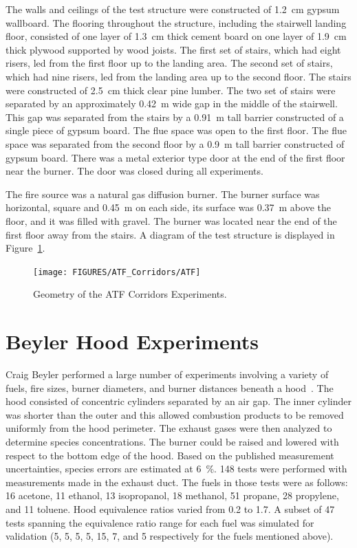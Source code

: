 The walls and ceilings of the test structure were constructed of 1.2~cm gypsum wallboard.
The flooring throughout the structure, including the stairwell landing floor, consisted of one layer of 1.3~cm thick cement board on one
layer of 1.9~cm thick plywood supported by wood joists. The first set of stairs, which had eight risers, led from the first floor up to the landing area.
The second set of stairs, which had nine risers, led from the landing area up to the second floor.
The stairs were constructed of 2.5~cm thick clear pine lumber. The two set of stairs were separated by an approximately 0.42~m wide gap in the middle of the stairwell.
This gap was separated from the stairs by a 0.91~m tall barrier constructed of a single piece of gypsum board.
The flue space was open to the first floor.  The flue space was separated from the second floor by a 0.9~m tall barrier constructed of gypsum board.
There was a metal exterior type door at the end of the first floor near the burner.  The door was closed during all experiments.

The fire source was a natural gas diffusion burner.  The burner surface was horizontal, square and 0.45~m on each side, its surface was 0.37~m above the floor, and it was filled with gravel.
The burner was located near the end of the first floor away from the stairs. A diagram of the test structure is displayed in Figure~\ref{ATF Drawing}.


\begin{figure}
\begin{center}
\texttt{[image: FIGURES/ATF\_Corridors/ATF]}
\end{center}
\caption{Geometry of the ATF Corridors Experiments.}
\label{ATF Drawing}
\end{figure}

\clearpage



\section{Beyler Hood Experiments}

Craig Beyler performed a large number of experiments involving a variety of fuels, fire sizes, burner diameters, and
burner distances beneath a hood~\cite{Beyler:Hood}.  The hood consisted of concentric cylinders separated
by an air gap.  The inner cylinder was shorter than the outer and this allowed combustion products to be removed
uniformly from the hood perimeter.  The exhaust gases were then analyzed to determine species concentrations.
The burner could be raised and lowered with respect to the bottom edge of the hood.  Based on the published
measurement uncertainties, species errors are estimated at 6~\%.  148 tests were performed with measurements made in the
exhaust duct.  The fuels in those tests were as follows: 16 acetone, 11 ethanol, 13 isopropanol, 18 methanol, 51 propane, 28 propylene, and 11 toluene.
Hood equivalence ratios varied from 0.2 to 1.7.  A subset of 47 tests spanning the equivalence ratio range for each fuel was simulated for
validation (5, 5, 5, 5, 15, 7, and 5 respectively for the fuels mentioned above).



